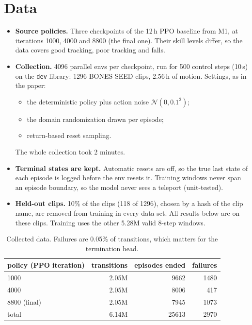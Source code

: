 \documentclass[10pt]{article}
\begin{document}
\section{Data}

\begin{itemize}
  \item \textbf{Source policies.} Three checkpoints of the 12\,h PPO baseline from M1, at iterations
  1000, 4000 and 8800 (the final one). Their skill levels differ, so the data covers good tracking,
  poor tracking and falls.
  \item \textbf{Collection.} 4096 parallel envs per checkpoint, run for 500 control steps (10\,s) on the
  \texttt{dev} library: 1296 BONES-SEED clips, 2.56\,h of motion. Settings, as in the paper:
  \begin{itemize}
    \item the deterministic policy plus action noise $\mathcal N(0, 0.1^2)$;
    \item the domain randomization drawn per episode;
    \item return-based reset sampling.
  \end{itemize}
  The whole collection took 2 minutes.
  \item \textbf{Terminal states are kept.} Automatic resets are off, so the true last state of each
  episode is logged before the env resets it. Training windows never span an episode boundary, so the
  model never sees a teleport (unit-tested).
  \item \textbf{Held-out clips.} 10\% of the clips (118 of 1296), chosen by a hash of the clip name, are
  removed from training in every data set. All results below are on these clips. Training uses the
  other 5.28M valid 8-step windows.
\end{itemize}

\begin{table}[H]
\centering\small
\caption{Collected data. Failures are 0.05\% of transitions, which matters for the termination head.}
\label{tab:data}
\begin{tabular}{lrrr}\toprule
policy (PPO iteration) & transitions & episodes ended & failures \\\midrule
1000 & 2.05M & 9662 & 1480 \\
4000 & 2.05M & 8006 & 417 \\
8800 (final) & 2.05M & 7945 & 1073 \\\midrule
total & 6.14M & 25613 & 2970 \\\bottomrule
\end{tabular}
\end{table}
\end{document}

